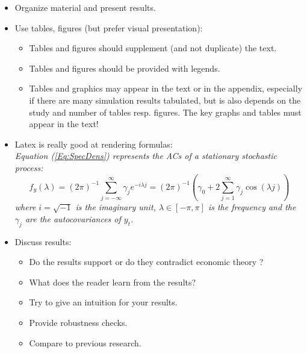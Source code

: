 \documentclass[a4paper,11pt]{article}
\begin{document}
\begin{itemize}

    \item Organize material and present results.

    \item Use tables, figures (but prefer visual presentation):
        \begin{itemize}
            \item Tables and figures should supplement (and not duplicate) the
                text.

            \item Tables and figures should be provided with
            legends.\\

            \item Tables and graphics may appear in the text or in
                the appendix, especially if there are many simulation results
                tabulated, but is also depends on the study and number of tables resp.
                figures. The key graphs and tables must appear in
                the text!
        \end{itemize}

    \item Latex is really good at rendering formulas:\\
        {\it Equation (\ref{Eq:SpecDens}) represents the ACs of a stationary
        stochastic process:
        \begin{equation}
            f_y(\lambda) = (2\pi)^{-1} \sum_{j=-\infty}^{\infty}
                           \gamma_j e^{-i\lambda j}
                         =(2\pi)^{-1}\left(\gamma_0 + 2 \sum_{j=1}^{\infty}
        \gamma_j \cos(\lambda j)\right)
                                        \label{Eq:SpecDens}
        \end{equation}
        where $i=\sqrt{-1}$ is the imaginary unit, $\lambda \in [-\pi,
        \pi]$ is the frequency and the $\gamma_j$ are the autocovariances
        of $y_t$.}

\newpage

    \item Discuss results:
        \begin{itemize}
            \item Do the results support or do they contradict economic theory ?
            \item What does the reader learn from the results?
            \item Try to give an intuition for your results.
            \item Provide robustness checks.
            \item Compare to previous research.
        \end{itemize}
\end{itemize}

\end{document}
